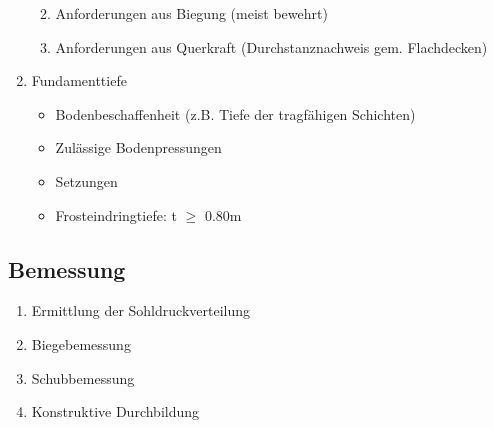 \begin{multicols}{2}
\begin{enumerate}
\begin{enumerate}
\begin{itemize}
							\end{itemize}
					
						\item Anforderungen aus Biegung (meist bewehrt)
					
						\item Anforderungen aus Querkraft (Durchstanznachweis gem. Flachdecken)
					
					\end{enumerate}
			
				\item Fundamenttiefe
					\begin{itemize}
						
						\item Bodenbeschaffenheit (z.B. Tiefe der tragfähigen Schichten)
						\item Zulässige Bodenpressungen
						\item Setzungen
						\item Frosteindringtiefe: t $\geq$ 0.80m
						
						
					\end{itemize}
				
			\end{enumerate}
		
		
%	
%
		
		\subsection{Bemessung}
			
			\begin{enumerate}
				
				\item Ermittlung der Sohldruckverteilung
				
				\item Biegebemessung
				
				\item Schubbemessung
				
				\item Konstruktive Durchbildung
				
			\end{enumerate}
		
		
		

\end{multicols}	

	\begin{minipage}{0.5\linewidth}
		
		
		
	\end{minipage}